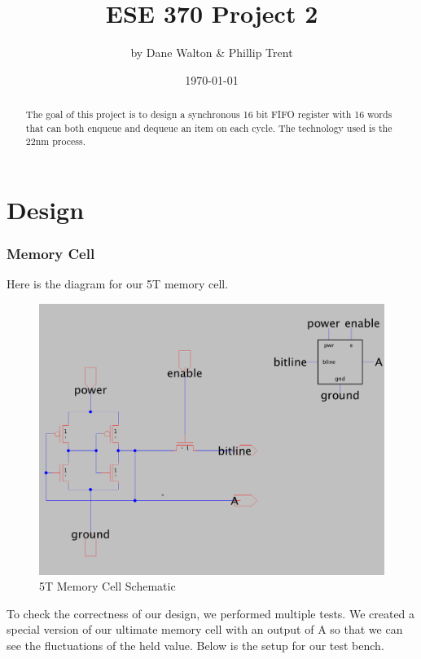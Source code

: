 \documentclass[a4paper]{article}
\title{ESE 370 Project 2}
\author{by Dane Walton \& Phillip Trent}
\date{\today}
\begin{document}
\maketitle

\begin{abstract}
The goal of this project is to design a synchronous 16 bit FIFO register with 16 words that can both enqueue and dequeue an item on each cycle. The technology used is the 22nm process.
\end{abstract}

\section{Design}
\label{sec:design}
\subsubsection{Memory Cell}
Here is the diagram for our 5T memory cell.\\

 \begin{figure}[H]
 	\centering
	 \includegraphics[scale=0.2]{5TCell}
	 \caption{5T Memory Cell Schematic}
	 \label{fig:5TCell}
 \end{figure}
 
To check the correctness of our design, we performed multiple tests. We created a special version of our ultimate memory cell with an output of A so that we can see the fluctuations of the held value. Below is the setup for our test bench.\\
\end{document}

